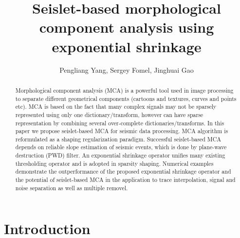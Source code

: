 \title{Seislet-based morphological component analysis using exponential shrinkage}

\renewcommand{\thefootnote}{\fnsymbol{footnote}}

\author{Pengliang Yang\footnotemark[1], Sergey Fomel\footnotemark[2], Jinghuai Gao\footnotemark[1]}


\address{
\footnotemark[1] Xi'an Jiaotong University\\
National Engineering Laboratory for Offshore Oil Exploration\\
Xi'an, China, 710049\\
\footnotemark[2] Bureau of Economic Geology,\\
John A. and Katherine G. Jackson School of Geosciences \\
The University of Texas at Austin \\
University Station, Box X \\
Austin, TX, USA, 78713-8924}



\maketitle

\begin{abstract}
Morphological component analysis (MCA) is a powerful tool used in image processing to separate different geometrical components (cartoons and textures, curves and points etc). MCA is based on the fact that many complex signals may not be sparsely represented using only one dictionary/transform, however can have sparse representation by combining several over-complete dictionaries/transforms. In this paper we propose seislet-based MCA for seismic data processing. MCA algorithm is reformulated as a shaping regularization paradigm. Successful seislet-based MCA depends on reliable slope estimation of seismic events, which is done by plane-wave destruction (PWD) filter. An exponential shrinkage operator unifies many existing thresholding operator and is adopted in sparsity shaping. Numerical examples demonstrate the outperformance of the proposed exponential shrinkage operator and the potential of seislet-based MCA in the application to trace interpolation, signal and noise separation as well as multiple removel.
\end{abstract}


\section{Introduction}

